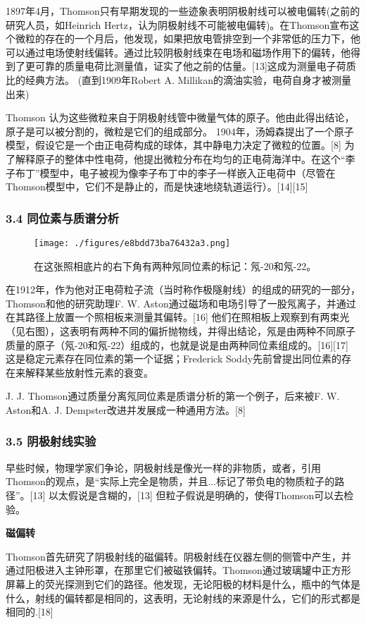 1897年4月，Thomson只有早期发现的一些迹象表明阴极射线可以被电偏转(之前的研究人员，如Heinrich Hertz，认为阴极射线不可能被电偏转)。在Thomson宣布这个微粒的存在的一个月后，他发现，如果把放电管排空到一个非常低的压力下，他可以通过电场使射线偏转。通过比较阴极射线束在电场和磁场作用下的偏转，他得到了更可靠的质量电荷比测量值，证实了他之前的估量。[13]这成为测量电子荷质比的经典方法。 (直到1909年Robert A. Millikan的滴油实验，电荷自身才被测量出来)

Thomson 认为这些微粒来自于阴极射线管中微量气体的原子。他由此得出结论，原子是可以被分割的，微粒是它们的组成部分。 1904年，汤姆森提出了一个原子模型，假设它是一个由正电荷构成的球体，其中静电力决定了微粒的位置。[8] 为了解释原子的整体中性电荷，他提出微粒分布在均匀的正电荷海洋中。在这个“李子布丁”模型中，电子被视为像李子布丁中的李子一样嵌入正电荷中（尽管在Thomson模型中，它们不是静止的，而是快速地绕轨道运行）。[14][15]

\subsubsection{3.4 同位素与质谱分析}
\begin{figure}[ht]
\centering
\texttt{[image: ./figures/e8bdd73ba76432a3.png]}
\caption{在这张照相底片的右下角有两种氖同位素的标记：氖-20和氖-22。} \label{fig_Joseph_1}
\end{figure}
在1912年，作为他对正电荷粒子流（当时称作极隧射线）的组成的研究的一部分，Thomson和他的研究助理F. W. Aston通过磁场和电场引导了一股氖离子，并通过在其路径上放置一个照相板来测量其偏转。[16] 他们在照相板上观察到有两束光（见右图），这表明有两种不同的偏折抛物线，并得出结论，氖是由两种不同原子质量的原子（氖-20和氖-22）组成的，也就是说是由两种同位素组成的。[16][17] 这是稳定元素存在同位素的第一个证据；Frederick Soddy先前曾提出同位素的存在来解释某些放射性元素的衰变。

J. J. Thomson通过质量分离氖同位素是质谱分析的第一个例子，后来被F. W. Aston和A. J. Dempster改进并发展成一种通用方法。[8]

\subsubsection{3.5 阴极射线实验}
早些时候，物理学家们争论，阴极射线是像光一样的非物质，或者，引用Thomson的观点，是“实际上完全是物质，并且...标记了带负电的物质粒子的路径”。[13] 以太假说是含糊的，[13] 但粒子假说是明确的，使得Thomson可以去检验。

\textbf{磁偏转}

Thomson首先研究了阴极射线的磁偏转。阴极射线在仪器左侧的侧管中产生，并通过阳极进入主钟形罩，在那里它们被磁铁偏转。Thomson通过玻璃罐中正方形屏幕上的荧光探测到它们的路径。他发现，无论阳极的材料是什么，瓶中的气体是什么，射线的偏转都是相同的，这表明，无论射线的来源是什么，它们的形式都是相同的.[18]

